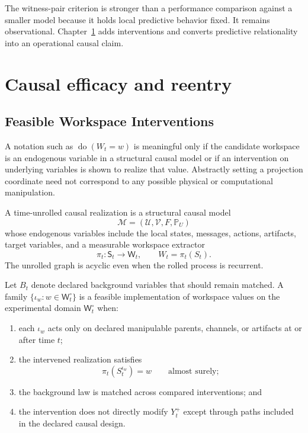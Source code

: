 The witness-pair criterion is stronger than a performance comparison against a
smaller model because it holds local predictive behavior fixed. It remains
observational. Chapter~\ref{SRWT:book:chapter-74} adds interventions and converts predictive
relationality into an operational causal claim.


\chapter{Causal efficacy and reentry}\label{SRWT:book:chapter-74}


\section{Feasible Workspace Interventions}

A notation such as \(\operatorname{do}(W_t=w)\) is meaningful only if the
candidate workspace is an endogenous variable in a structural causal model or
if an intervention on underlying variables is shown to realize that value.
Abstractly setting a projection coordinate need not correspond to any possible
physical or computational manipulation.

\begin{SRWTdefinition}\label{SRWT:def:causal-realization}
A time-unrolled causal realization is a structural causal model
\[
\mathcal M
=
(\mathcal U,\mathcal V,F,\mathbb P_U)
\]
whose endogenous variables include the local states, messages, actions,
artifacts, target variables, and a measurable workspace extractor
\[
\pi_t:\mathsf S_t\to\mathsf W_t,
\qquad
W_t=\pi_t(S_t).
\]
The unrolled graph is acyclic even when the rolled process is recurrent.
\end{SRWTdefinition}

\begin{SRWTdefinition}
Let \(B_t\) denote declared background variables that should remain matched.
A family \(\{\iota_w:w\in\mathsf W_t^\circ\}\) is a feasible implementation of
workspace values on the experimental domain \(\mathsf W_t^\circ\) when:
\begin{enumerate}
\item each \(\iota_w\) acts only on declared manipulable parents, channels, or
 artifacts at or after time \(t\);
\item the intervened realization satisfies
\[
\pi_t(S_t^{\iota_w})=w
\qquad\text{almost surely};
\]
\item the background law is matched across compared interventions; and
\item the intervention does not directly modify \(Y_t^+\) except through
 paths included in the declared causal design.
\end{enumerate}
\end{SRWTdefinition}

